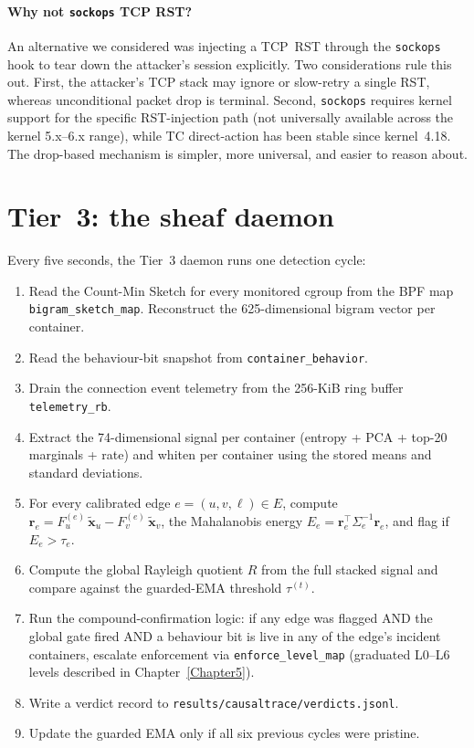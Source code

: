\paragraph{Why not \texttt{sockops} TCP RST?} An alternative we
considered was injecting a TCP~RST through the \texttt{sockops} hook to
tear down the attacker's session explicitly. Two considerations rule
this out. First, the attacker's TCP stack may ignore or slow-retry a
single RST, whereas unconditional packet drop is terminal. Second,
\texttt{sockops} requires kernel support for the specific RST-injection
path (not universally available across the kernel 5.x--6.x range), while
TC direct-action has been stable since kernel~4.18. The drop-based
mechanism is simpler, more universal, and easier to reason about.

\section{Tier~3: the sheaf daemon}
\label{sec:tier3}

Every five seconds, the Tier~3 daemon runs one detection cycle:

\begin{enumerate}
  \item Read the Count-Min Sketch for every monitored cgroup from the BPF
    map \texttt{bigram\_sketch\_map}. Reconstruct the 625-dimensional
    bigram vector per container.
  \item Read the behaviour-bit snapshot from
    \texttt{container\_behavior}.
  \item Drain the connection event telemetry from the 256-KiB ring
    buffer \texttt{telemetry\_rb}.
  \item Extract the 74-dimensional signal per container (entropy + PCA +
    top-20 marginals + rate) and whiten per container using the stored
    means and standard deviations.
  \item For every calibrated edge $e = (u, v, \ell) \in E$, compute
    $\mathbf{r}_e = F_u^{(e)}\,\tilde{\mathbf{x}}_u - F_v^{(e)}\,\tilde{\mathbf{x}}_v$,
    the Mahalanobis energy $E_e = \mathbf{r}_e^\top \Sigma_e^{-1} \mathbf{r}_e$,
    and flag if $E_e > \tau_e$.
  \item Compute the global Rayleigh quotient $R$ from the full stacked
    signal and compare against the guarded-EMA threshold $\tau^{(t)}$.
  \item Run the compound-confirmation logic: if any edge was flagged AND
    the global gate fired AND a behaviour bit is live in any of the
    edge's incident containers, escalate enforcement via
    \texttt{enforce\_level\_map} (graduated L0--L6 levels described in
    Chapter~\ref{Chapter5}).
  \item Write a verdict record to \texttt{results/causaltrace/verdicts.jsonl}.
  \item Update the guarded EMA only if all six previous cycles were
    pristine.
\end{enumerate}


